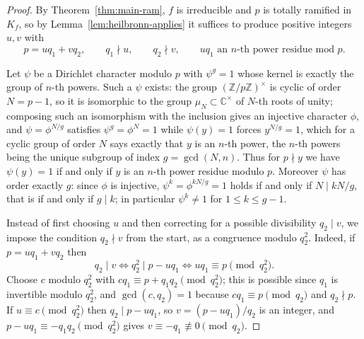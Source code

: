 \documentclass[11pt,reqno]{amsart}
\theoremstyle{plain}
\theoremstyle{definition}
\theoremstyle{remark}
\newcommand{\Z}{\mathbb{Z}}
\begin{document}
\begin{proof}
By Theorem~\ref{thm:main-ram}, $f$ is irreducible and $p$ is totally ramified in $K_f$, so by
Lemma~\ref{lem:heilbronn-applies} it suffices to produce positive integers $u,v$ with
\begin{equation}\label{eq:target}
  p=uq_1+vq_2,\qquad q_1\nmid u,\qquad q_2\nmid v,\qquad uq_1 \text{ an } n\text{-th power residue mod } p .
\end{equation}

Let $\psi$ be a Dirichlet character modulo $p$ with $\psi^{g}=1$ whose kernel is exactly the group
of $n$-th powers. Such a $\psi$ exists: the group $(\Z/p\Z)^{\times}$ is cyclic of order $N=p-1$,
so it is isomorphic to the group $\mu_N\subset\mathbb{C}^{\times}$ of $N$-th roots of unity; composing
such an isomorphism with the inclusion gives an injective character $\phi$, and
$\psi=\phi^{N/g}$ satisfies $\psi^{g}=\phi^{N}=1$ while $\psi(y)=1$ forces $y^{N/g}=1$, which for
a cyclic group of order $N$ says exactly that $y$ is an $n$-th power, the $n$-th powers being the
unique subgroup of index $g=\gcd(N,n)$. Thus for $p\nmid y$ we have $\psi(y)=1$ if and only if $y$
is an $n$-th power residue modulo $p$. Moreover $\psi$ has order exactly $g$: since $\phi$ is
injective, $\psi^{k}=\phi^{kN/g}=1$ holds if and only if $N\mid kN/g$, that is if and only if
$g\mid k$; in particular $\psi^{k}\ne1$ for $1\le k\le g-1$.

Instead of first choosing $u$ and then correcting for a possible divisibility $q_2\mid v$, we
impose the condition $q_2\nmid v$ from the start, as a congruence modulo $q_2^2$. Indeed, if
$p=uq_1+vq_2$ then
\[
  q_2\mid v \iff q_2^{2}\mid p-uq_1 \iff uq_1\equiv p \pmod{q_2^{2}} .
\]
Choose $c$ modulo $q_2^{2}$ with $cq_1\equiv p+q_1q_2 \pmod{q_2^{2}}$; this is possible since
$q_1$ is invertible modulo $q_2^2$, and $\gcd(c,q_2)=1$ because $cq_1\equiv p\pmod{q_2}$ and
$q_2\nmid p$. If $u\equiv c\pmod {q_2^{2}}$ then $q_2\mid p-uq_1$, so $v=(p-uq_1)/q_2$ is an
integer, and $p-uq_1\equiv -q_1q_2 \pmod {q_2^{2}}$ gives $v\equiv -q_1\not\equiv0\pmod{q_2}$.


\end{proof}
\end{document}
